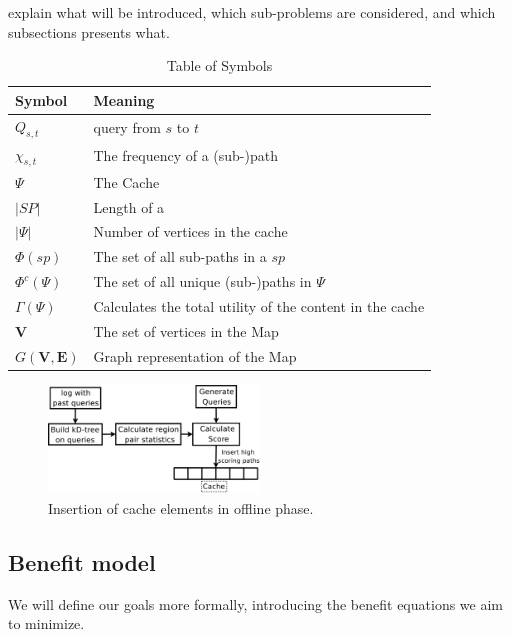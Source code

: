 explain what will be introduced, which sub-problems are considered, and which subsections presents what.


\begin{table}
\begin{tabular*}{\columnwidth}{|l|p{}|}
\hline
\bf Symbol		& \bf Meaning \\\hline
$Q_{s,t}$		& \spath query from $s$ to $t$ \\\hline
$\chi_{s,t}$		& The frequency of a (sub-)path \\\hline
$\Psi$ 			& The Cache \\\hline
$|SP|$			& Length of a \spath \\\hline
$|\Psi|$		& Number of vertices in the cache \\\hline
$\Phi(sp)$		& The set of all sub-paths in a \spath $sp$ \\\hline
$\Phi^c(\Psi)$		& The set of all unique (sub-)paths in $\Psi$ \\\hline
$\Gamma(\Psi)$		& Calculates the total utility of the content in the cache \\\hline 
$\mathbf{V}$ 		& The set of vertices in the Map \\\hline 
$G\mathbf{(V,E)}$ 	& Graph representation of the Map \\\hline 
\end{tabular*}
\caption{Table of Symbols}
\label{tab:symbols}
\end{table}


\begin{figure}[bht]
  \center
        \includegraphics[width=0.5\textwidth]{figures/fillcache}
        \caption{Insertion of cache elements in offline phase.}
  \label{fig:fillcache}
\end{figure}


\subsection{Benefit model}

We will define our goals more formally, introducing the benefit equations we aim to minimize.

